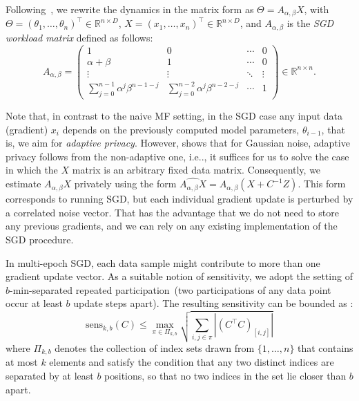 \documentclass{article} %
\makeatletter
\DeclareRobustCommand\onedot{\futurelet\@let@token\@onedot}
\def\@onedot{\ifx\@let@token.\else.\null\fi\xspace}
\def\ie{{i.e}\onedot} \def\Ie{{I.e}\onedot}
\newcommand{\R}{\mathbb{R}}
\makeatother
\begin{document}
Following~\citet{kalinin2024}, we rewrite the dynamics in the matrix form as $\Theta=A_{\alpha, \beta}X$, 
with $\Theta=(\theta_1,\dots,\theta_n)^\top\in\R^{n\times D}$, $X=(x_1,\dots,x_n)^\top\in\R^{n\times D}$,
and $A_{\alpha,\beta}$ is the \emph{SGD workload matrix} defined as follows:
\begin{equation}
    A_{\alpha,\beta} = \begin{pmatrix}
        1 & 0 &  \cdots & 0 \\
        \alpha + \beta & 1 &  \cdots & 0 \\
        \vdots & \vdots  & \ddots & \vdots \\
        \sum\limits_{j = 0}^{n - 1}\alpha^{j}\beta^{n - 1 - j} & \sum\limits_{j = 0}^{n - 2}\alpha^{j}\beta^{n - 2 - j} & \cdots & 1
    \end{pmatrix}\in\R^{n\times n}.\label{eq:A_alpha_beta}
\end{equation}

Note that, in contrast to the naive MF setting, in the SGD case any input data (gradient) $x_i$ depends 
on the previously computed model parameters, $\theta_{i-1}$, that is, we aim for \emph{adaptive privacy}.  
%
However, \citet{Denisov} shows that for Gaussian noise, adaptive privacy follows from the non-adaptive one,
\ie, it suffices for us to solve the case in which the $X$ matrix is an arbitrary fixed data matrix. 
%
Consequently, we estimate $A_{\alpha, \beta}X$ privately using the form $\widehat{A_{\alpha, \beta}X} = A_{\alpha, \beta}(X + C^{-1}Z)$.
%
This form corresponds to running SGD, but each individual gradient update is perturbed by a correlated noise vector. 
%
That has the advantage that we do not need to store any previous gradients, and we can rely on any existing implementation of the SGD procedure.

In multi-epoch SGD, each data sample might contribute to more than one gradient update vector. 
%
As a suitable notion of sensitivity, we adopt the setting of $b$-min-separated repeated participation~(two participations of 
any data point occur at least $b$ update steps apart). The resulting sensitivity can be bounded as \citet{choquette2023amplified}:
\begin{equation}
\label{eq:sens_k_b}
    \text{sens}_{k,b}(C) \leq \max_{\pi \in \Pi_{k,b}} \sqrt{\sum_{i,j \in \pi} |(C^\top C)_{[i,j]}|}
\end{equation}
where $\Pi_{k,b}$ denotes the collection of index sets drawn from $\{1,\ldots,n\}$ that contains at most $k$ elements and satisfy the condition that any two distinct indices are separated by at least $b$ positions, so that no two indices in the set lie closer than $b$ apart.
\end{document}
